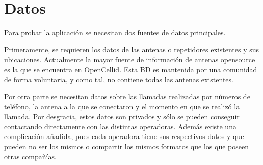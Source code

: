   \section{Datos}
    Para probar la aplicación se necesitan dos fuentes de datos principales.
    
    Primeramente, se requieren los datos de las antenas o repetidores existentes y sus ubicaciones. Actualmente la mayor fuente de información de antenas opensource es la que se encuentra en OpenCellid\cite{opencellid}. Esta BD es mantenida por una comunidad de forma voluntaria, y como tal, no contiene todas las antenas existentes.
    
    Por otra parte se necesitan datos sobre las llamadas realizadas por números de teléfono, la antena a la que se conectaron y el momento en que se realizó la llamada. Por desgracia, estos datos son privados y sólo se pueden conseguir contactando directamente con las distintas operadoras. Además existe una complicación añadida, pues cada operadora tiene sus respectivos datos y que pueden no ser los mismos o compartir los mismos formatos que los que poseen otras compañías.